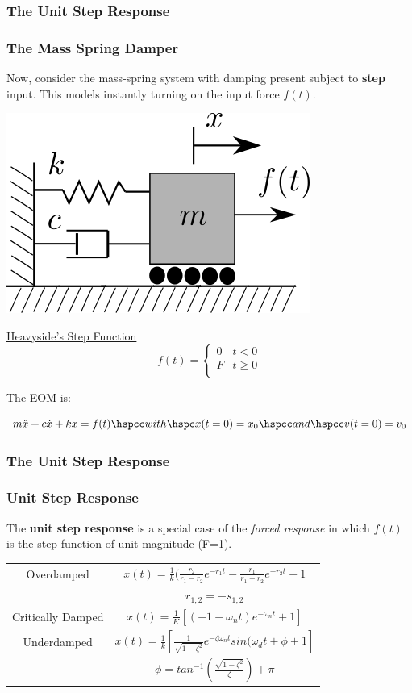 \documentclass[fleqn]{beamer} %
\newcommand{\sectionIVsubsectionItitle}{The Unit Step Response}
\begin{document}
			\begin{frame}
				\frametitle{\sectionIVsubsectionItitle}
				\bigskip

				\frametitle{The Mass Spring Damper}

				\large Now, consider the mass-spring system with damping present subject to {\bf step} input. This models instantly turning on the input force $f(t)$.\vspc

				\begin{multicols}{2}

					\includegraphics[scale=.4]{images/mass_spring_04.png} \hspc  

					\underline{Heavyside's Step Function}\vspc
					\[f(t) = \begin{cases} 
					      0 & t < 0 \\
					      F & t\geq 0 \\
					   \end{cases}
					\]

				\end{multicols}

				\large The EOM is:

					\[ m\ddot{x} +c\dot{x}+kx=f(t) \hspcc with \hspc x(t=0)=x_0 \hspcc and \hspcc v(t=0)=v_0 \] 

				\btVFill
			\end{frame}

			\begin{frame}
				\frametitle{\sectionIVsubsectionItitle}
				\bigskip

				\frametitle{Unit Step Response}
				The {\bf unit step response} is a special case of the {\it forced response} in which $f(t)$ is the step function of unit magnitude (F=1). \vspcc
				\renewcommand{\arraystretch}{2}
				\begin{tabular}{|c|c|}
				Overdamped & $ x(t)=\frac{1}{k}(\frac{r_2}{r_1-r_2}e^{-r_1t}-\frac{r_1}{r_1-r_2}e^{-r_2t}+1 $ \\
				& $r_{1,2}=-s_{1,2}$ \\
				Critically Damped & $ x(t)=\frac{1}{K}[(-1-\omega_nt)e^{-\omega_nt}+1] $ \\
				Underdamped & $ x(t)=\frac{1}{k}\left[\frac{1}{\sqrt{1-\zeta^2}}e^{-\zeta\omega_nt}sin(\omega_dt+\phi+1\right] $ \\
				& $ \phi=tan^{-1}\left(\frac{\sqrt{1-\zeta^2}}{\zeta}\right)+\pi $ \\
				\end{tabular}
			
				
				\btVFill
			\end{frame}
\end{document}
